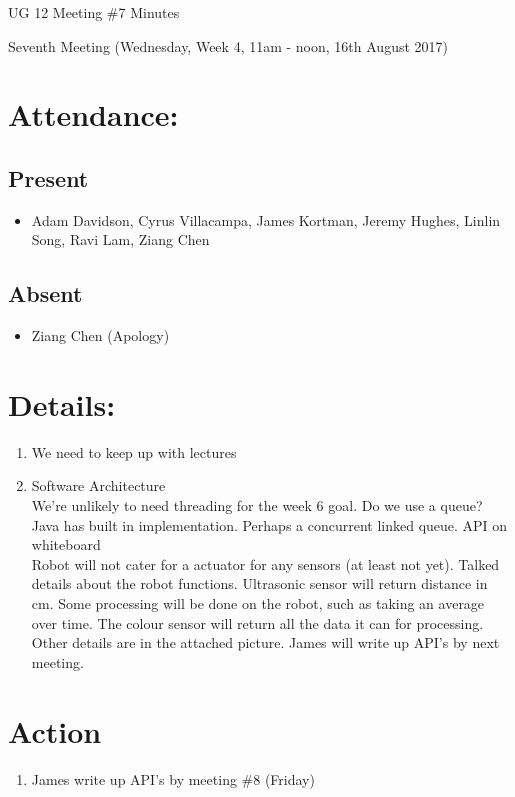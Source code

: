 \documentclass{article}
\begin{document}
\begin{adjustwidth}{2.5em}{0pt}
\begin{center}
\Large{UG 12 Meeting \#7 Minutes}\\
\end{center}
\end{adjustwidth}
\justify

Seventh Meeting (Wednesday, Week 4, 11am - noon, 16th August 2017)
\section{Attendance:}
\subsection*{Present}
\begin{itemize}
\item Adam Davidson, Cyrus Villacampa, James Kortman, Jeremy Hughes, Linlin Song, Ravi Lam, Ziang Chen
\end{itemize}
\subsection*{Absent}
\begin{itemize}
\item Ziang Chen (Apology)
\end {itemize}

\section{Details:}
\begin{enumerate}
\item We need to keep up with lectures
\item Software Architecture\\
We're unlikely to need threading for the week 6 goal. Do we use a queue? Java has built in implementation. Perhaps a concurrent linked queue.
API on whiteboard\\
Robot will not cater for a actuator for any sensors (at least not yet). Talked details about the robot functions. Ultrasonic sensor will return distance in cm. Some processing will be done on the robot, such as taking an average over time. The colour sensor will return all the data it can for processing. Other details are in the attached picture. James will write up API's by next meeting.
\end{enumerate}

\section{Action}
\begin{enumerate}
\item James write up API's by meeting \#8 (Friday)
\end{enumerate}
\end{document}
